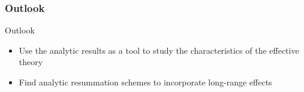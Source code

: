 \documentclass[12pt,a4paper,dvipsnames,usenames]{beamer}
\begin{document}
\begin{frame}
  \frametitle{Outlook}

  {\color{LightUIRed} Outlook}

  \vspace{.2cm}
  \begin{itemize}
    \setlength\itemsep{1em}
    \item Use the analytic results as a tool to study the characteristics of the effective theory
    \item Find analytic resummation schemes to incorporate long-range effects
  \end{itemize}
  
\end{frame}
\end{document}
